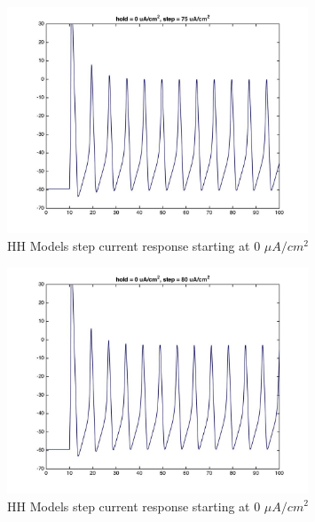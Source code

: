 \documentclass{beamer}
\begin{document}
\begin{frame}
  \begin{figure}
    \centering
    \includegraphics[width = 0.8\textwidth]{./images/current_0_75.jpg}
    \caption{HH Models step current response starting at 0 $\mu A/cm^2$}
  \end{figure}
\end{frame}


\begin{frame}
  \begin{figure}
    \centering
    \includegraphics[width = 0.8\textwidth]{./images/current_0_80.jpg}
    \caption{HH Models step current response starting at 0 $\mu A/cm^2$}
  \end{figure}
\end{frame}
\end{document}
